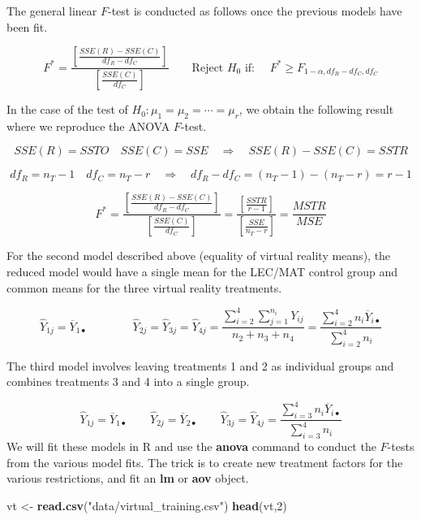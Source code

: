 \documentclass[
]{book}
\newenvironment{Shaded}{\begin{snugshade}}{\end{snugshade}}
\newcommand{\DecValTok}[1]{\textcolor[rgb]{0.00,0.00,0.81}{#1}}
\newcommand{\FunctionTok}[1]{\textcolor[rgb]{0.13,0.29,0.53}{\textbf{#1}}}
\newcommand{\NormalTok}[1]{#1}
\newcommand{\OtherTok}[1]{\textcolor[rgb]{0.56,0.35,0.01}{#1}}
\newcommand{\StringTok}[1]{\textcolor[rgb]{0.31,0.60,0.02}{#1}}
\begin{document}
The general linear \(F\)-test is conducted as follows once the previous
models have been fit.

\[
  F^*=\frac{\left[\frac{SSE(R)-SSE(C)}{df_R-df_C}\right]}{\left[\frac{SSE(C)}{df_C}\right]}
  \qquad \mbox{Reject } H_0 \mbox{ if: } \quad F^* \geq F_{1-\alpha,df_R-df_C, df_C}
  \]

In the case of the test of \(H_0:\mu_1=\mu_2=\cdots = \mu_r\), we obtain
the following result where we reproduce the ANOVA \(F\)-test.

\[
SSE(R)=SSTO \quad SSE(C) = SSE \quad \Rightarrow \quad SSE(R)-SSE(C)=SSTR
\]

\[ 
df_R = n_T-1 \quad df_C = n_T-r \quad \Rightarrow \quad df_R-df_C =
\left(n_T-1\right)-\left(n_T-r\right) = r-1
\]

\[
 F^*=\frac{\left[\frac{SSE(R)-SSE(C)}{df_R-df_C}\right]}{\left[\frac{SSE(C)}{df_C}\right]}=
 \frac{\left[\frac{SSTR}{r-1}\right]}{\left[\frac{SSE}{n_T-r}\right]}=\frac{MSTR}{MSE}
\]

For the second model described above (equality of virtual reality
means), the reduced model would have a single mean for the LEC/MAT
control group and common means for the three virtual reality treatments.

\[
 \hat{Y}_{1j}=\overline{Y}_{1\bullet}  \qquad \qquad 
 \hat{Y}_{2j}=\hat{Y}_{3j}=\hat{Y}_{4j}=\frac{\sum_{i=2}^4\sum_{j=1}^{n_i}Y_{ij}}{n_2+n_3+n_4} = \frac{\sum_{i=2}^4n_i\overline{Y}_{i\bullet}}{\sum_{i=2}^4 n_i}
\]

The third model involves leaving treatments 1 and 2 as individual groups
and combines treatments 3 and 4 into a single group.

\[
 \hat{Y}_{1j}=\overline{Y}_{1\bullet}  \qquad
 \hat{Y}_{2j}=\overline{Y}_{2\bullet}  \qquad
 \hat{Y}_{3j}=\hat{Y}_{4j}=  \frac{\sum_{i=3}^4n_i\overline{Y}_{i\bullet}}{\sum_{i=3}^4 n_i}
\] We will fit these models in R and use the \textbf{anova} command to
conduct the \(F\)-tests from the various model fits. The trick is to
create new treatment factors for the various restrictions, and fit an
\textbf{lm} or \textbf{aov} object.

\begin{Shaded}
\begin{Highlighting}[]
\NormalTok{vt }\OtherTok{\textless{}{-}} \FunctionTok{read.csv}\NormalTok{(}\StringTok{"data/virtual\_training.csv"}\NormalTok{)}
\FunctionTok{head}\NormalTok{(vt,}\DecValTok{2}\NormalTok{)}
\end{Highlighting}
\end{Shaded}
\end{document}
